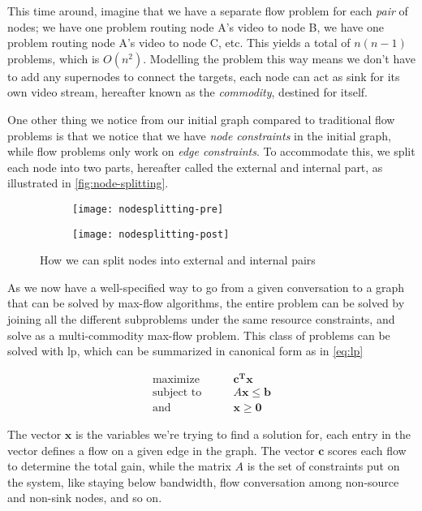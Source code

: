 This time around, imagine that we have a separate flow problem for each \emph{pair} of nodes; we have one problem routing node A's video to node B, we have one problem routing node A's video to node C, etc. This yields a total of $n(n-1)$ problems, which is $O(n^2)$. Modelling the problem this way means we don't have to add any supernodes to connect the targets, each node can act as sink for its own video stream, hereafter known as the \emph{commodity}, destined for itself.

One other thing we notice from our initial graph compared to traditional flow problems is that we notice that we have \emph{node constraints} in the initial graph, while flow problems only work on \emph{edge constraints}. To accommodate this, we split each node into two parts, hereafter called the external and internal part, as illustrated in \autoref{fig:node-splitting}.

\begin{figure}
    \centering
    \begin{subfigure}[t]{.48\textwidth}
        \centering
        \texttt{[image: nodesplitting-pre]}
    \end{subfigure}
    \hfill
    \begin{subfigure}[t]{.48\textwidth}
        \centering
        \texttt{[image: nodesplitting-post]}
    \end{subfigure}
    \caption{How we can split nodes into external and internal pairs}
    \label{fig:node-splitting}
\end{figure}

As we now have a well-specified way to go from a given conversation to a graph that can be solved by max-flow algorithms, the entire problem can be solved by joining all the different subproblems under the same resource constraints, and solve as a multi-commodity max-flow problem. This class of problems can be solved with \gls{lp}, which can be summarized in canonical form as in \autoref{eq:lp}

\begin{align}\label{eq:lp}
    \text{maximize}\qquad &\mathbf{c^Tx} \\
    \text{subject to}\qquad &A\mathbf{x} \leq \mathbf{b} \nonumber \\
    \text{and}\qquad &\mathbf{x} \geq \mathbf{0} \nonumber
\end{align}

The vector $\mathbf{x}$ is the variables we're trying to find a solution for, each entry in the vector defines a flow on a given edge in the graph. The vector $\mathbf{c}$ scores each flow to determine the total gain, while the matrix $A$ is the set of constraints put on the system, like staying below bandwidth, flow conversation among non-source and non-sink nodes, and so on.

